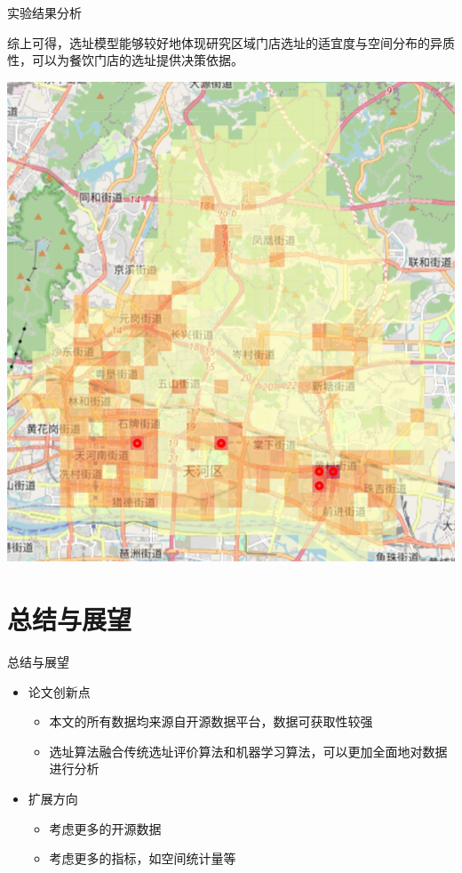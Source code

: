 \documentclass{beamer}
\begin{document}
\begin{frame}{实验结果分析}
    \begin{minipage}{0.37\textwidth}
        综上可得，选址模型能够较好地体现研究区域门店选址的适宜度与空间分布的异质性，可以为餐饮门店的选址提供决策依据。
      \end{minipage}
      \hfill
      \begin{minipage}{0.6\textwidth}
        \includegraphics[width=1\textwidth]{pic/result2.png}
      \end{minipage}
\end{frame}



\section{总结与展望}
\begin{frame}{总结与展望}
    \begin{itemize}
        \item 论文创新点
        \begin{itemize}
            \item 本文的所有数据均来源自开源数据平台，数据可获取性较强
            \item 选址算法融合传统选址评价算法和机器学习算法，可以更加全面地对数据进行分析
        \end{itemize}
        \item 扩展方向
        \begin{itemize}
            \item 考虑更多的开源数据
            \item 考虑更多的指标，如空间统计量等
        \end{itemize}
    \end{itemize}
\end{frame}
\end{document}
